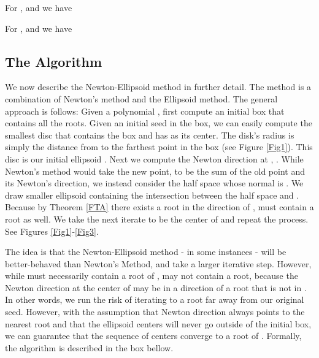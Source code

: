 \documentclass{article}
\begin{document}
For ,  and we have

For ,  and we have



\subsection{The Algorithm}
We now describe the Newton-Ellipsoid method in further detail. The method is a combination of Newton's method and the Ellipsoid method. The general approach is follows: Given a polynomial , first compute an initial box that contains all the roots. Given an initial seed  in the box, we can easily compute the smallest disc that contains the box and has  as its center. The disk's radius is simply the distance from  to the farthest point in the box (see Figure \ref{Fig1}). This disc is our initial ellipsoid .  Next we compute the Newton direction at , . While Newton's method would take the new point,  to be the sum of the old point and its Newton's direction, we instead consider the half space  whose normal is . We draw smaller ellipsoid  containing the intersection between the half space and . Because by Theorem \ref{FTA} there exists a root in the direction of ,  must contain a root as well. We take the next iterate  to be the center of  and repeat the process. See Figures \ref{Fig1}-\ref{Fig3}.

The idea is that the Newton-Ellipsoid method - in some instances - will be better-behaved than Newton's Method, and take a larger iterative step. However, while  must necessarily contain a root of ,  may not contain a root, because the Newton direction at the center of  may be in a direction of a root that is not in . In other words, we run the risk of iterating to a root far away from our original seed. However, with the assumption that Newton direction always points to the nearest root and that the ellipsoid centers will never go outside of the initial box, we can guarantee that the sequence of centers converge to a root of . Formally, the algorithm is described in the box bellow.
\end{document}
